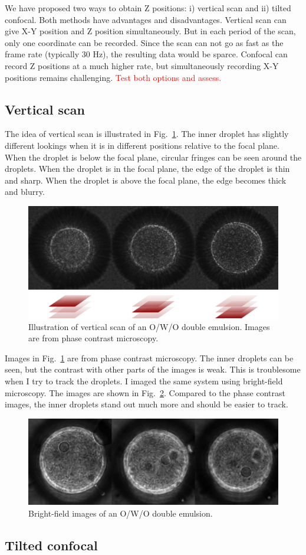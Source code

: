 \documentclass[onecolumn,aps, pre,amsmath,amssymb,longbibliography,12pt]{revtex4-2}
\begin{document}
We have proposed two ways to obtain Z positions: i) vertical scan and ii) tilted confocal.
Both methods have advantages and disadvantages.
Vertical scan can give X-Y position and Z position simultaneously.
But in each period of the scan, only one coordinate can be recorded.
Since the scan can not go as fast as the frame rate (typically 30 Hz), the resulting data would be sparce.
Confocal can record Z positions at a much higher rate, but simultaneously recording X-Y positions remains challenging.
\textcolor{red}{Test both options and assess.}

\subsection{Vertical scan}
The idea of vertical scan is illustrated in Fig.~\ref{fig:manual-scan}.
The inner droplet has slightly different lookings when it is in different positions relative to the focal plane.
When the droplet is below the focal plane, circular fringes can be seen around the droplets.
When the droplet is in the focal plane, the edge of the droplet is thin and sharp.
When the droplet is above the focal plane, the edge becomes thick and blurry.

\begin{figure}[h]
  \includegraphics{manual-scan.png}
  \caption{Illustration of vertical scan of an O/W/O double emulsion. Images are from phase contrast microscopy.}
  \label{fig:manual-scan}
\end{figure}

Images in Fig.~\ref{fig:manual-scan} are from phase contrast microscopy.
The inner droplets can be seen, but the contrast with other parts of the images is weak.
This is troublesome when I try to track the droplets.
I imaged the same system using bright-field microscopy.
The images are shown in Fig.~\ref{fig:bright-field-images}.
Compared to the phase contrast images, the inner droplets stand out much more and should be easier to track.

\begin{figure}[h]
  \includegraphics{bright-field-images.png}
  \caption{Bright-field images of an O/W/O double emulsion.}
  \label{fig:bright-field-images}
\end{figure}


\subsection{Tilted confocal}
\end{document}
